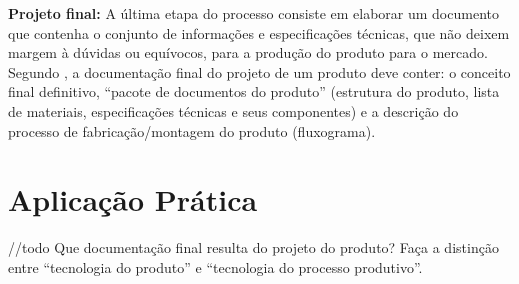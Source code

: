 \textbf{Projeto final:} A última etapa do processo consiste em elaborar um documento que contenha o conjunto de informações e especificações técnicas, que não deixem margem à dúvidas ou equívocos, para a produção do produto para o mercado. Segundo \cite{slack2006administracao}, a documentação final do projeto de um produto deve conter: o conceito final definitivo, ``pacote de documentos do produto'' (estrutura do produto, lista de materiais, especificações técnicas e seus componentes) e a descrição do processo de fabricação/montagem do produto (fluxograma).


\section{Aplicação Prática}
\label{sec:projeto_do_produto_aplicacao}

//todo  Que documentação final resulta do projeto do produto? Faça a
distinção entre “tecnologia do produto” e “tecnologia do processo produtivo”.